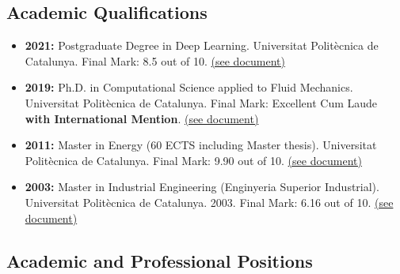 \documentclass{article}
\begin{document}
\vspace{0.5cm}

\subsection{Academic Qualifications}

\begin{itemize}
\item {\bf 2021:} Postgraduate Degree in Deep Learning. Universitat Politècnica de Catalunya. Final Mark: 8.5 out of 10. \hyperlink{postgrau-DL.1}{(see document)}
\item {\bf 2019:} Ph.D. in Computational Science applied to Fluid Mechanics. Universitat Politècnica de Catalunya. Final Mark: Excellent Cum Laude {\bf with International Mention}. 
\hyperlink{doctorat.1}{(see document)}
\item {\bf 2011:} Master in Energy (60 ECTS including Master thesis). Universitat Politècnica de Catalunya. Final Mark: 9.90 out of 10. \hyperlink{master-E.1}{(see document)}
\item {\bf 2003:} Master in Industrial Engineering (Enginyeria Superior Industrial). Universitat Politècnica de Catalunya. 2003. Final Mark: 6.16 out of 10.  \hyperlink{carrera-EI.1}{(see document)}
\end{itemize}

\subsection{Academic and Professional Positions}
\end{document}
